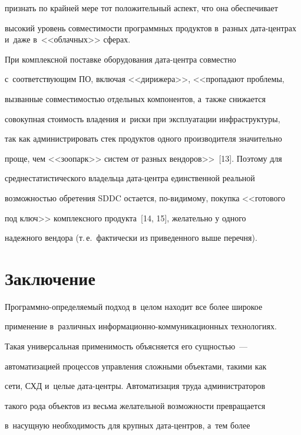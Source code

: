 признать по крайней мере тот положительный аспект, что она обеспечивает 


высокий уровень со\-вмес\-ти\-мости программных продуктов в~разных да\-та-цент\-рах и~даже в~<<облачных>> сферах.


    


    При комплексной поставке оборудования да\-та-цент\-ра совместно 


с~соответствующим ПО, включая <<дирижера>>, <<пропадают проб\-ле\-мы, 


вызванные со\-вмес\-ти\-мостью отдельных компонентов, а~также снижается 


совокупная сто\-имость владения и~риски при эксплуатации инфраструктуры, 


так как администрировать стек продуктов одного производителя значительно 


проще, чем <<зоопарк>> сис\-тем от разных вендоров>>~[13]. Поэтому для 


среднестатистического владельца да\-та-цент\-ра единственной реальной 


возможностью обретения SDDC остается, по-ви\-ди\-мо\-му, покупка <<готового 


под ключ>> комплексного продукта~[14, 15], желательно у одного 


надежного вендора (т.\,е.\ фактически из приведенного выше перечня).


    


\section{Заключение}





    Программно-определяемый подход в~целом находит все более широкое 


применение в~различных информационно-коммуникационных технологиях. 


Такая универсальная применимость объясняется его сущ\-ностью~--- 


автоматизацией процессов управ\-ле\-ния сложными объектами, такими как 


сети, СХД и~целые да\-та-цент\-ры. Автоматизация труда администраторов 


такого рода объектов из весьма желательной возможности превращается 


в~насущную не\-об\-хо\-ди\-мость для крупных да\-та-цент\-ров, а~тем более 


